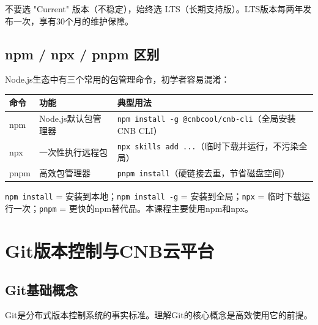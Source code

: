 \begin{notebox}[版本选择提示]
不要选 "Current" 版本（不稳定），始终选 LTS（长期支持版）。LTS版本每两年发布一次，享有30个月的维护保障。
\end{notebox}

\subsection{npm / npx / pnpm 区别}

Node.js生态中有三个常用的包管理命令，初学者容易混淆：

\begin{table}[H]
\centering
\begin{tabular}{lp{4cm}p{5cm}}
\toprule
\textbf{命令} & \textbf{功能} & \textbf{典型用法} \\
\midrule
npm & Node.js默认包管理器 & \texttt{npm install -g @cnbcool/cnb-cli}（全局安装CNB CLI） \\
npx & 一次性执行远程包 & \texttt{npx skills add ...}（临时下载并运行，不污染全局） \\
pnpm & 高效包管理器 & \texttt{pnpm install}（硬链接去重，节省磁盘空间） \\
\bottomrule
\end{tabular}
\end{table}

\begin{notebox}[快速记忆]
\texttt{npm install} = 安装到本地；\texttt{npm install -g} = 安装到全局；\texttt{npx} = 临时下载运行一次；\texttt{pnpm} = 更快的npm替代品。本课程主要使用npm和npx。
\end{notebox}

\section{Git版本控制与CNB云平台}

\subsection{Git基础概念}

Git是分布式版本控制系统的事实标准。理解Git的核心概念是高效使用它的前提。

